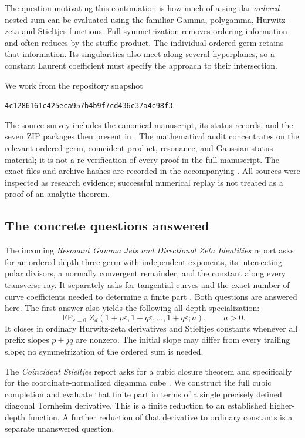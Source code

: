 \documentclass[11pt,letterpaper]{article}
\numberwithin{equation}{section}
\theoremstyle{definition}
\theoremstyle{remark}
\DeclareMathOperator{\FP}{FP}
\newcommand{\eps}{\varepsilon}
\newcommand{\src}[1]{\texttt{\detokenize{#1}}}
\begin{document}
The question motivating this continuation is how much of a singular
\emph{ordered} nested sum can be evaluated using the familiar Gamma,
polygamma, Hurwitz-zeta and Stieltjes functions. Full symmetrization
removes ordering information and often reduces by the stuffle product.
The individual ordered germ retains that information. Its singularities
also meet along several hyperplanes, so a constant Laurent coefficient
must specify the approach to their intersection.

We work from the repository snapshot
\begin{center}
\small\texttt{4c1286161c425eca957b4b9f7cd436c37a4c98f3}.
\end{center}
The source survey includes the canonical manuscript, its status records,
and the seven ZIP packages then present in \src{docs/incoming}. The
mathematical audit concentrates on the relevant ordered-germ,
coincident-product, resonance, and Gaussian-status material; it is
not a re-verification of every proof in the full manuscript.
The exact files and archive hashes are recorded in the accompanying
\src{integration/source_snapshot.json}. All sources were inspected as
research evidence; successful numerical replay is not treated as a
proof of an analytic theorem.

\subsection{The concrete questions answered}

The incoming \emph{Resonant Gamma Jets and Directional Zeta Identities}
report asks for an ordered depth-three germ with independent exponents,
its intersecting polar divisors, a normally convergent remainder, and
the constant along every transverse ray. It separately asks for
tangential curves and the exact number of curve coefficients needed
to determine a finite part \cite[Further research, Q1 and Q3]{repojets}.
Both questions are answered here. The first answer also yields the
following all-depth specialization:
\begin{equation}\label{scope:mainfamily}
 \FP_{\eps=0}Z_d(1+p\eps,1+q\eps,\ldots,1+q\eps;a),
 \qquad a>0.
\end{equation}
It closes in ordinary Hurwitz-zeta derivatives and Stieltjes constants
whenever all prefix slopes $p+jq$ are nonzero. The initial slope may
differ from every trailing slope; no symmetrization of the ordered sum
is needed.

The \emph{Coincident Stieltjes} report asks for a cubic closure theorem
and specifically for the coordinate-normalized digamma cube
\cite[Further research: cubic coincident moments]{repocoincident}.
We construct the full cubic completion and evaluate that finite part
in terms of a single precisely defined diagonal Tornheim derivative.
This is a finite reduction to an established higher-depth function.
A further reduction of that derivative to ordinary constants is a
separate unanswered question.
\end{document}
